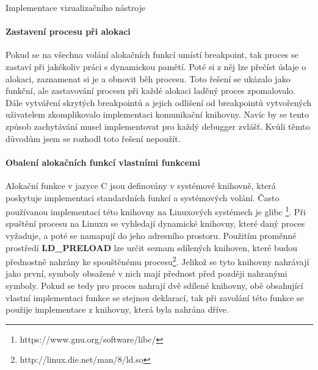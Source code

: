 \documentclass[czech,bachelor,male,python,dept460,hidelinks]{diploma}						%
\begin{document}
\begin{section}{Implementace vizualizačního nástroje}
				\paragraph*{Zastavení procesu při alokaci} Pokud se na všechna volání alokačních funkcí umístí breakpoint, tak proces se zastaví při jakékoliv práci s
				dynamickou pamětí. Poté si z něj lze přečíst údaje o alokaci, zaznamenat si je a obnovit běh procesu. Toto řešení se ukázalo jako funkční,
				ale zastavování procesu při každé alokaci laděný proces zpomalovalo. Dále vytváření skrytých breakpointů a jejich odlišení od breakpointů vytvořených
				uživatelem zkomplikovalo implementaci komunikační knihovny. Navíc by se tento způsob zachytávání musel
				implementovat pro každý debugger zvlášť. Kvůli těmto důvodům jsem se rozhodl toto řešení nepoužít.
				
				\paragraph*{Obalení alokačních funkcí vlastními funkcemi} Alokační funkce v jazyce C jsou definovány v systémové knihovně, která poskytuje
				implementaci standardních funkcí a systémových volání. Často používanou implementací této knihovny na Linuxových systémech je glibc
				\footnote{https://www.gnu.org/software/libc/}. Při spuštění procesu na Linuxu se vyhledají dynamické knihovny, které daný proces vyžaduje,
				a poté se namapují do jeho adresního prostoru. Použitím proměnné prostředí \textbf{LD\_PRELOAD} lze určit
				seznam sdílených knihoven, které budou přednostně nahrány ke spouštěnému procesu\footnote{http://linux.die.net/man/8/ld.so}.
				Jelikož se tyto knihovny nahrávají jako první, symboly obsažené v nich mají přednost před později nahranými symboly. Pokud se tedy pro proces
				nahrají dvě sdílené knihovny, obě obsahující vlastní implementaci funkce se stejnou deklarací, tak při zavolání této funkce se použije
				implementace z knihovny, která byla nahrána dříve.
				

\end{section}
\end{document}

